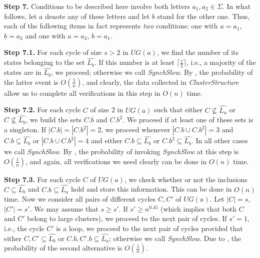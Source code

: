 \documentclass{jalc}
\begin{document}
\textbf{Step 7.} Conditions to be described here involve both letters $a_1,a_2\in\Sigma$. In what follows, let $a$ denote any of these letters and let $b$ stand for the other one. Thus, each of the following items in fact represents \emph{two} conditions: one with $a=a_1$, $b=a_2$ and one with $a=a_2$, $b=a_1$.

\smallskip

\textbf{Step 7.1.} For each cycle of size $s>2$ in $U\!G(a)$, we find the number of its states belonging to the set $\widehat{L_b}$. If this number is at least $\lceil\frac{s}2\rceil$, i.e., a majority of the states are in $\widehat{L_b}$, we proceed; otherwise we call \emph{SynchSlow}. By \cite[Theorem~2, Case~1]{Berlinkov:preprint}, the probability of the latter event is $O(\frac1n)$, and clearly, the data collected in \emph{ClusterStructure} allow us to complete all verifications in this step in $O(n)$ time.

\smallskip

\textbf{Step 7.2.} For each cycle $C$ of size 2 in $U\!G(a)$ such that either $C\nsubseteq\widehat{L_a}$ or $C\nsubseteq\widehat{L_b}$, we build the sets $C.b$ and $C.b^2$. We proceed if at least one of these sets is a singleton. If $|C.b|=|C.b^2|=2$, we proceed whenever $|C.b\cup C.b^2|=3$ and $C.b\subseteq\widehat{L_b}$ or $|C.b\cup C.b^2|=4$ and either $C.b\subseteq\widehat{L_b}$ or $C.b^2\subseteq\widehat{L_b}$. In all other cases we call \emph{SynchSlow}. By \cite[Remark~1]{Berlinkov:preprint}, the probability of invoking \emph{SynchSlow} at this step is $O(\frac1n)$, and again, all verifications we need clearly can be done in $O(n)$ time.

\smallskip

\textbf{Step 7.3.} For each cycle $C$ of $U\!G(a)$, we check whether or not the inclusions $C\subseteq\widehat{L_b}$ and $C.b\subseteq\widehat{L_a}$ hold and store this information. This can be done in $O(n)$ time. Now we consider all pairs of different cycles $C,C'$ of $U\!G(a)$. Let $|C|=s$, $|C'|=s'$. We may assume that $s\ge s'$. If $s'\ge n^{0.45}$ (which implies that both $C$ and $C'$ belong to large clusters), we proceed to the next pair of cycles. If $s'=1$, i.e., the cycle $C'$ is a loop, we proceed to the next pair of cycles provided that either $C,C'\subseteq\widehat{L_b}$ or $C.b,C'.b\subseteq\widehat{L_a}$; otherwise we call \emph{SynchSlow}. Due to \cite[Theorem~2, Case~2]{Berlinkov:preprint}, the probability of the second alternative is $O(\frac1n)$.
\end{document}
